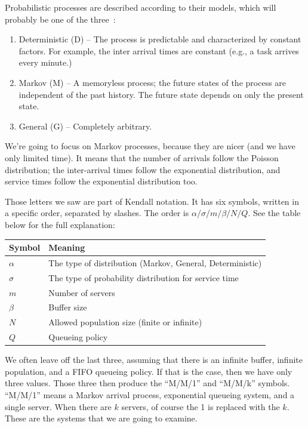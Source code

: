 \documentclass[a4paper]{report}
\begin{document}
Probabilistic processes are described according to their models, which will probably be one of the three~\cite{swps}:

\begin{enumerate}
	\item Deterministic (D) -- The process is predictable and characterized by constant factors. For example, the inter arrival times are constant (e.g., a task arrives every minute.)
	\item Markov (M) -- A memoryless process; the future states of the process are independent of the past history. The future state depends on only the present state.
	\item General (G) -- Completely arbitrary.
\end{enumerate}

We're going to focus on Markov processes, because they are nicer (and we have only limited time). It means that the number of arrivals follow the Poisson distribution; the inter-arrival times follow the exponential distribution, and service times follow the exponential distribution too. 

Those letters we saw are part of Kendall notation. It has six symbols, written in a specific order, separated by slashes. The order is $\alpha / \sigma / m / \beta / N / Q$. See the table below for the full explanation:

\begin{center}
\begin{tabular}{l|l} 
	\textbf{Symbol} & \textbf{Meaning} \\ \hline
	$\alpha$ & The type of distribution (Markov, General, Deterministic) \\ \hline
	$\sigma$ & The type of probability distribution for service time \\ \hline
	$m$ & Number of servers \\ \hline
	$\beta$ & Buffer size \\ \hline
	$N$ & Allowed population size (finite or infinite) \\ \hline
	$Q$ & Queueing policy \\ 
\end{tabular}
\end{center}

We often leave off the last three, assuming that there is an infinite buffer, infinite population, and a FIFO queueing policy. If that is the case, then we have only three values. Those three then produce the ``M/M/1'' and ``M/M/k'' symbols. ``M/M/1'' means a Markov arrival process, exponential queueing system, and a single server. When there are $k$ servers, of course the 1 is replaced with the $k$. These are the systems that we are going to examine.
\end{document}
